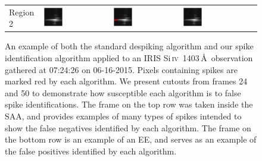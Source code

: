 \documentclass[10pt,letterpaper]{article}
\newcommand{\SiIV}{Si\,\textsc{iv}~1403\,\AA}
\newcommand{\EE}{\ac{EE}}
\newcommand{\SAA}{\ac{SAA}}
\begin{document}
\begin{figure}[h!]
\begin{tabular}{m{} m{} m{} m{} @{}m{0pt}@{}}
						Region 2 & \includegraphics[width=0.3\textwidth]{fig/orig_2} & \includegraphics[width=0.3\textwidth]{fig/despike_2} & \includegraphics[width=0.3\textwidth]{fig/dspk_2} & \\
					\end{tabular}
					
					\caption{An example of both the standard despiking algorithm and our spike identification algorithm applied to an IRIS \SiIV\ observation gathered at 07:24:26 on 06-16-2015.
						Pixels containing spikes are marked red by each algorithm.
						We present cutouts from frames 24 and 50 to demonstrate how susceptible each algorithm is to false spike identifications. 
						The frame on the top row was taken inside the \SAA, and provides examples of many types of spikes intended to show the false negatives identified by each algorithm.
						The frame on the bottom row is an example of an \EE, and serves as an example of the false positives identified by each algorithm.}
					
					\label{dspk_ex}
					
				\end{figure}
				
\end{document}
